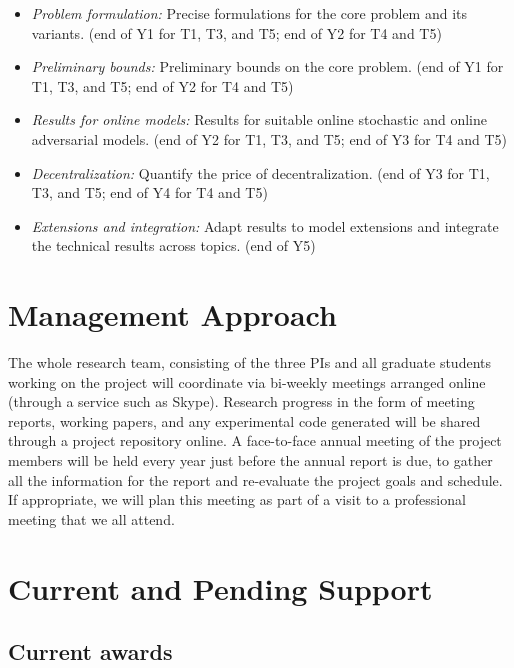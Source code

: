 \begin{itemize}
\item
{\sl Problem formulation:} Precise formulations for the core problem
and its variants.  (end of Y1 for T1, T3, and T5; end of Y2 for T4 and T5)
\item
{\sl Preliminary bounds:} Preliminary bounds on the core problem. (end
of Y1 for T1, T3, and T5; end of Y2 for T4 and T5)
\item
{\sl Results for online models:} Results for suitable online stochastic and
online adversarial models. (end of Y2 for T1, T3, and T5; end of Y3 for T4 and T5)
\item
{\sl Decentralization:} Quantify the price of decentralization.  (end
of Y3 for T1, T3, and T5; end of Y4 for T4 and T5)
\item
{\sl Extensions and integration:} Adapt results to model extensions
and integrate the technical results across topics. (end of Y5)
\end{itemize}

\section{Management Approach}

The whole research team, consisting of the three PIs and all graduate
students working on the project will coordinate via bi-weekly meetings
arranged online (through a service such as Skype). Research progress
in the form of meeting reports, working papers, and any experimental
code generated will be shared through a project repository online. A
face-to-face annual meeting of the project members will be held every
year just before the annual report is due, to gather all the
information for the report and re-evaluate the project goals and
schedule.  If appropriate, we will plan this meeting as part of a
visit to a professional meeting that we all attend.

\section{Current and Pending Support}

\subsection{Current awards}

